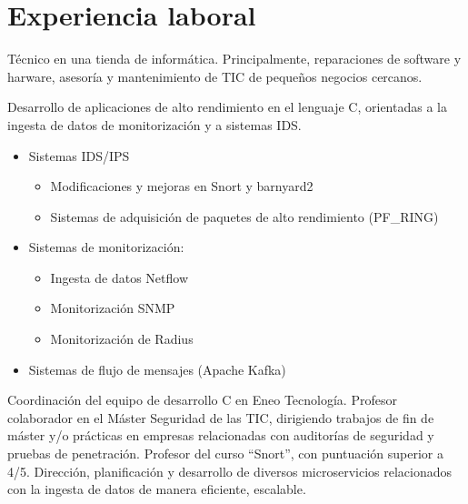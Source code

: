 \documentclass[11pt,a4paper,sans]{moderncv}
\begin{document}
\section{Experiencia laboral}
{Técnico en una tienda de informática. Principalmente, reparaciones de software y harware,
asesoría y mantenimiento de TIC de pequeños negocios cercanos.\newline{}}
{Desarrollo de aplicaciones de alto rendimiento en el lenguaje C, orientadas a la
ingesta de datos de monitorización y a sistemas IDS.\newline
\begin{itemize}%
  \item Sistemas IDS/IPS
  \begin{itemize}
    \item Modificaciones y mejoras en Snort y barnyard2
    \item Sistemas de adquisición de paquetes de alto rendimiento (PF\_RING)
  \end{itemize}
  \item Sistemas de monitorización:
  \begin{itemize}
    \item Ingesta de datos Netflow
    \item Monitorización SNMP
    \item Monitorización de Radius
  \end{itemize}
  \item Sistemas de flujo de mensajes (Apache Kafka)
\end{itemize}}
{Coordinación del equipo de desarrollo C en Eneo Tecnología.}
{Profesor colaborador en el Máster Seguridad de las TIC, dirigiendo
trabajos de fin de máster y/o prácticas en empresas relacionadas con
auditorías de seguridad y pruebas de penetración.}
{Profesor del curso ``Snort'', con puntuación superior a 4/5.}
{Dirección, planificación y desarrollo de diversos microservicios
relacionados con la ingesta de datos de manera eficiente, escalable.}
\end{document}
